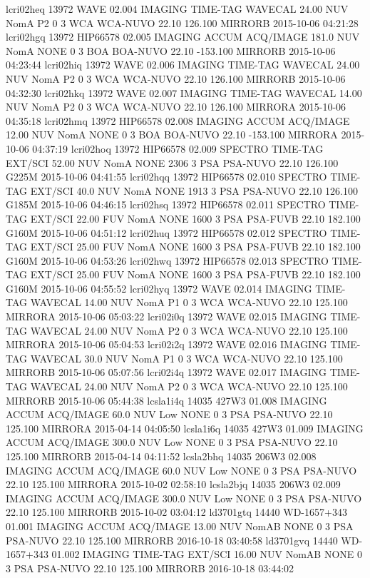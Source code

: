 lcri02heq 13972 WAVE 02.004 IMAGING TIME-TAG WAVECAL 24.00 NUV NomA P2 0 3 WCA WCA-NUVO 22.10 126.100 MIRRORB 2015-10-06 04:21:28
lcri02hgq 13972 HIP66578 02.005 IMAGING ACCUM ACQ/IMAGE 181.0 NUV NomA NONE 0 3 BOA BOA-NUVO 22.10 -153.100 MIRRORB 2015-10-06 04:23:44
lcri02hiq 13972 WAVE 02.006 IMAGING TIME-TAG WAVECAL 24.00 NUV NomA P2 0 3 WCA WCA-NUVO 22.10 126.100 MIRRORB 2015-10-06 04:32:30
lcri02hkq 13972 WAVE 02.007 IMAGING TIME-TAG WAVECAL 14.00 NUV NomA P2 0 3 WCA WCA-NUVO 22.10 126.100 MIRRORA 2015-10-06 04:35:18
lcri02hmq 13972 HIP66578 02.008 IMAGING ACCUM ACQ/IMAGE 12.00 NUV NomA NONE 0 3 BOA BOA-NUVO 22.10 -153.100 MIRRORA 2015-10-06 04:37:19
lcri02hoq 13972 HIP66578 02.009 SPECTRO TIME-TAG EXT/SCI 52.00 NUV NomA NONE 2306 3 PSA PSA-NUVO 22.10 126.100 G225M 2015-10-06 04:41:55
lcri02hqq 13972 HIP66578 02.010 SPECTRO TIME-TAG EXT/SCI 40.0 NUV NomA NONE 1913 3 PSA PSA-NUVO 22.10 126.100 G185M 2015-10-06 04:46:15
lcri02hsq 13972 HIP66578 02.011 SPECTRO TIME-TAG EXT/SCI 22.00 FUV NomA NONE 1600 3 PSA PSA-FUVB 22.10 182.100 G160M 2015-10-06 04:51:12
lcri02huq 13972 HIP66578 02.012 SPECTRO TIME-TAG EXT/SCI 25.00 FUV NomA NONE 1600 3 PSA PSA-FUVB 22.10 182.100 G160M 2015-10-06 04:53:26
lcri02hwq 13972 HIP66578 02.013 SPECTRO TIME-TAG EXT/SCI 25.00 FUV NomA NONE 1600 3 PSA PSA-FUVB 22.10 182.100 G160M 2015-10-06 04:55:52
lcri02hyq 13972 WAVE 02.014 IMAGING TIME-TAG WAVECAL 14.00 NUV NomA P1 0 3 WCA WCA-NUVO 22.10 125.100 MIRRORA 2015-10-06 05:03:22
lcri02i0q 13972 WAVE 02.015 IMAGING TIME-TAG WAVECAL 24.00 NUV NomA P2 0 3 WCA WCA-NUVO 22.10 125.100 MIRRORA 2015-10-06 05:04:53
lcri02i2q 13972 WAVE 02.016 IMAGING TIME-TAG WAVECAL 30.0 NUV NomA P1 0 3 WCA WCA-NUVO 22.10 125.100 MIRRORB 2015-10-06 05:07:56
lcri02i4q 13972 WAVE 02.017 IMAGING TIME-TAG WAVECAL 24.00 NUV NomA P2 0 3 WCA WCA-NUVO 22.10 125.100 MIRRORB 2015-10-06 05:44:38
lcsla1i4q 14035 427W3 01.008 IMAGING ACCUM ACQ/IMAGE 60.0 NUV Low NONE 0 3 PSA PSA-NUVO 22.10 125.100 MIRRORA 2015-04-14 04:05:50
lcsla1i6q 14035 427W3 01.009 IMAGING ACCUM ACQ/IMAGE 300.0 NUV Low NONE 0 3 PSA PSA-NUVO 22.10 125.100 MIRRORB 2015-04-14 04:11:52
lcsla2bhq 14035 206W3 02.008 IMAGING ACCUM ACQ/IMAGE 60.0 NUV Low NONE 0 3 PSA PSA-NUVO 22.10 125.100 MIRRORA 2015-10-02 02:58:10
lcsla2bjq 14035 206W3 02.009 IMAGING ACCUM ACQ/IMAGE 300.0 NUV Low NONE 0 3 PSA PSA-NUVO 22.10 125.100 MIRRORB 2015-10-02 03:04:12
ld3701gtq 14440 WD-1657+343 01.001 IMAGING ACCUM ACQ/IMAGE 13.00 NUV NomAB NONE 0 3 PSA PSA-NUVO 22.10 125.100 MIRRORB 2016-10-18 03:40:58
ld3701gvq 14440 WD-1657+343 01.002 IMAGING TIME-TAG EXT/SCI 16.00 NUV NomAB NONE 0 3 PSA PSA-NUVO 22.10 125.100 MIRRORB 2016-10-18 03:44:02
